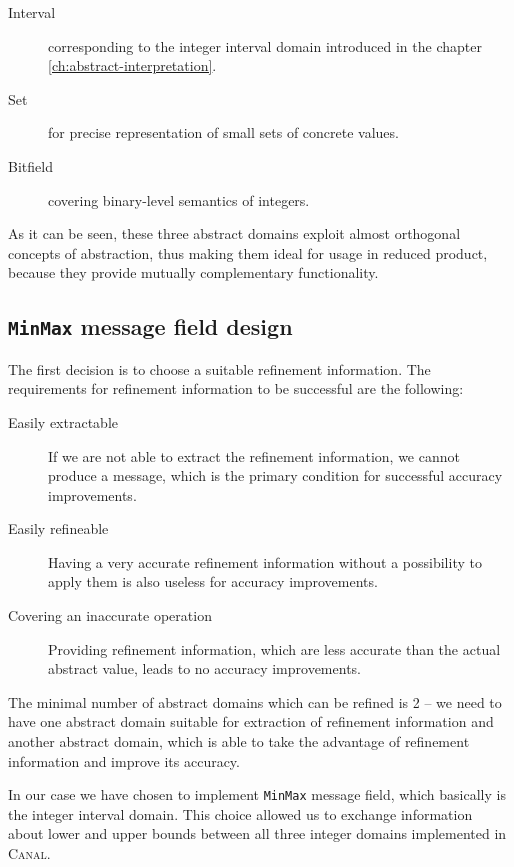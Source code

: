 \documentclass[12pt,oneside]{fithesis2}
\theoremstyle{definition}
\begin{document}
\begin{description}
  \item[Interval] corresponding to the integer interval domain introduced in the chapter \ref{ch:abstract-interpretation}.
  \item[Set] for precise representation of small sets of concrete values.
  \item[Bitfield] covering binary-level semantics of integers.
\end{description}

As it can be seen, these three abstract domains exploit almost orthogonal concepts of abstraction, thus making them ideal for usage in reduced product, because they provide mutually complementary functionality.

\subsection{\texttt{MinMax} message field design}

The first decision is to choose a suitable refinement information. The requirements for refinement information to be successful are the following:

\begin{description}
  \item[Easily extractable] If we are not able to extract the refinement information, we cannot produce a message, which is the primary condition for successful accuracy improvements.
  \item[Easily refineable] Having a very accurate refinement information without a possibility to apply them is also useless for accuracy improvements.
  \item[Covering an inaccurate operation] Providing refinement information, which are less accurate than the actual abstract value, leads to no accuracy improvements.
\end{description}

The minimal number of abstract domains which can be refined is 2 -- we need to have one abstract domain suitable for extraction of refinement information and another abstract domain, which is able to take the advantage of refinement information and improve its accuracy.

In our case we have chosen to implement \texttt{MinMax} message field, which basically is the integer interval domain. This choice allowed us to exchange information about lower and upper bounds between all three integer domains implemented in \textsc{Canal}.
\end{document}
